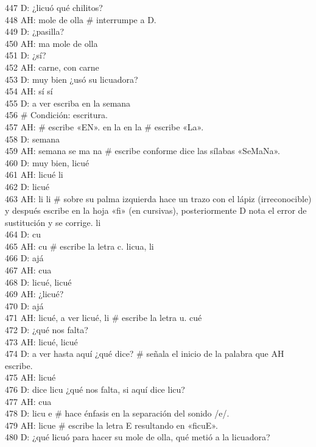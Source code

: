 447 D: ¿licuó qué chilitos?\\
448 AH: mole de olla \# interrumpe a D.\\
449 D: ¿pasilla?\\
450 AH: ma mole de olla\\
451 D: ¿sí?\\
452 AH: carne, con carne\\
453 D: muy bien ¿usó su licuadora?\\
454 AH: sí sí\\
455 D: a ver escriba en la semana\\
456 \# Condición: escritura.\\
457 AH: \# escribe «EN». en la en la \# escribe «La».\\
458 D: semana\\
459 AH: semana se ma na \# escribe conforme dice las sílabas «SeMaNa».\\
460 D: muy bien, licué\\
461 AH: licué li\\
462 D: licué\\
463 AH: li li \# sobre su palma izquierda hace un trazo con el lápiz (irreconocible) y después escribe en la hoja «fi» (en cursivas), posteriormente D nota el error de sustitución y se corrige. li\\
464 D: cu\\
465 AH: cu \# escribe la letra c. licua, li\\
466 D: ajá\\
467 AH: cua\\
468 D: licué, licué\\
469 AH: ¿licué?\\
470 D: ajá\\
471 AH: licué, a ver licué, li \# escribe la letra u. cué\\
472 D: ¿qué nos falta?\\
473 AH: licué, licué\\
474 D: a ver hasta aquí ¿qué dice? \# señala el inicio de la palabra que AH escribe.\\
475 AH: licué\\
476 D: dice licu ¿qué nos falta, si aquí dice licu?\\
477 AH: cua\\
478 D: licu e \# hace énfasis en la separación del sonido /e/.\\
479 AH: licue \# escribe la letra E resultando en «ficuE».\\
480 D: ¿qué licuó para hacer su mole de olla, qué metió a la licuadora?\\
